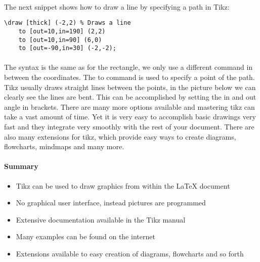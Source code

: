   \paragraph{}
  The next snippet shows how to draw a line by specifying a path in Tikz:
  \begin{lstlisting}[language={[LaTeX]TeX},breaklines=true,frame=single]
    \draw [thick] (-2,2) % Draws a line
    to [out=10,in=190] (2,2)
    to [out=10,in=90] (6,0) 
    to [out=-90,in=30] (-2,-2);   
  \end{lstlisting}
  \paragraph{}
  The syntax is the same as for the rectangle, we only use a different command in between the coordinates. The to command is used to specify a point of the path. Tikz usually draws straight lines between the points, in the picture below we can clearly see the lines are bent. This can be accomplished by setting the in and out angle in brackets. There are many more options available and mastering tikz can take a vast amount of time. Yet it is very easy to accomplish basic drawings very fast and they integrate very smoothly with the rest of your document. There are also many extensions for tikz, which provide easy ways to create diagrams, flowcharts, mindmaps and many more.

  \paragraph{Summary}
    \begin{itemize} %
      \item Tikz can be used to draw graphics from within the LaTeX document
      \item No graphical user interface, instead pictures are programmed
      \item Extensive documentation available in the Tikz manual
      \item Many examples can be found on the internet
      \item Extensions available to easy creation of diagrams, flowcharts and so forth
    \end{itemize} 
